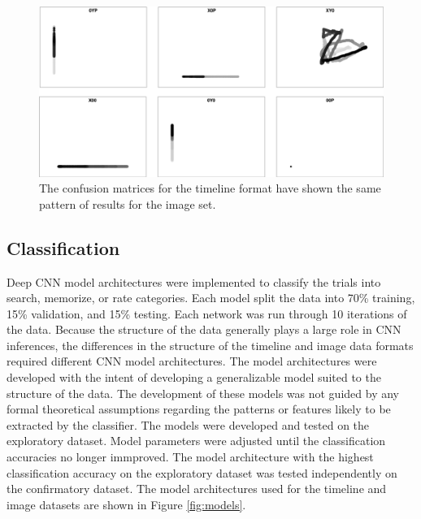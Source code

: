 \documentclass[
  english,
  man,floatsintext]{apa6}
\begin{document}
\begin{figure}
\centering
\includegraphics{images/subset_imgs.png}
\caption{\label{fig:ave-subset}The confusion matrices for the timeline format have shown the same pattern of results for the image set.}
\end{figure}

\subsection{Classification}

Deep CNN model architectures were implemented to classify the trials into search, memorize, or rate categories. Each model split the data into 70\% training, 15\% validation, and 15\% testing. Each network was run through 10 iterations of the data. Because the structure of the data generally plays a large role in CNN inferences, the differences in the structure of the timeline and image data formats required different CNN model architectures. The model architectures were developed with the intent of developing a generalizable model suited to the structure of the data. The development of these models was not guided by any formal theoretical assumptions regarding the patterns or features likely to be extracted by the classifier. The models were developed and tested on the exploratory dataset. Model parameters were adjusted until the classification accuracies no longer immproved. The model architecture with the highest classification accuracy on the exploratory dataset was tested independently on the confirmatory dataset. The model architectures used for the timeline and image datasets are shown in Figure \ref{fig:models}.
\end{document}
